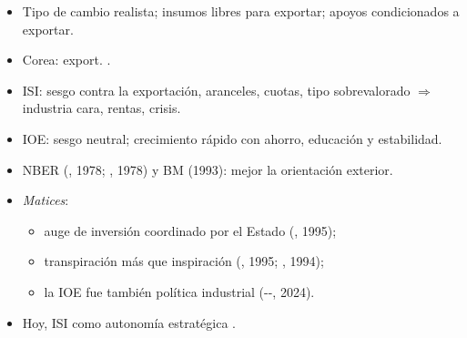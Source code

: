 \documentclass{article}
\begin{document}
\begin{columnas}
\begin{itemize}
\begin{itemize}
  \item Tipo de cambio realista; insumos libres para exportar; apoyos condicionados a exportar.
  \item Corea: export. .
  \end{itemize}
\end{itemize}
\begin{itemize}
\item ISI: sesgo contra la exportación, aranceles, cuotas, tipo sobrevalorado $\Rightarrow$ industria cara, rentas, crisis.
\item IOE: sesgo neutral; crecimiento rápido con ahorro, educación y estabilidad.
\item NBER (, 1978; , 1978) y BM (1993): mejor la orientación exterior.
\item \emph{Matices}:
  \begin{itemize}
  \item auge de inversión coordinado por el Estado (, 1995);
  \item transpiración más que inspiración (, 1995; , 1994);
  \item la IOE fue también política industrial (--, 2024).
  \end{itemize}
\item Hoy, ISI como autonomía estratégica .
\end{itemize}


\end{columnas}
\end{document}
